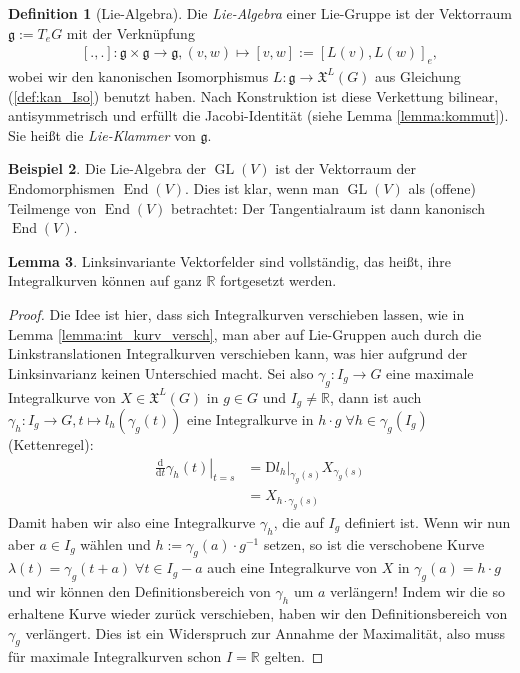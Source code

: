 \documentclass[a4paper]{scrbook}
\numberwithin{equation}{chapter}
\newcommand{\D}{\mathrm{d}}
\newcommand{\DD}{\mathrm{D}}
\DeclareMathOperator{\GL}{GL}
\DeclareMathOperator{\End}{End}
\newcommand{\R}{\mathbb{R}}
\newcommand{\vf}{\mathfrak{X}}
\theoremstyle{definition}
\newtheorem{defn}{Definition}[section]
\newtheorem{lemma}[defn]{Lemma}
\newtheorem{bsp}[defn]{Beispiel}
\begin{document}
		\begin{defn}[Lie-Algebra]
			Die \emph{Lie-Algebra} einer Lie-Gruppe ist der Vektorraum $\mathfrak{g}:=T_eG$ mit der Verknüpfung
			\begin{align*}
				\left[.,.\right]\colon \mathfrak{g}\times \mathfrak{g}\rightarrow \mathfrak{g}, (v,w)\mapsto \left[v,w\right]:=\left[L(v),L(w)\right]_e,
			\end{align*}
			wobei wir den kanonischen Isomorphismus $L\colon \mathfrak{g}\to \vf^L(G)$ aus Gleichung (\ref{def:kan_Iso}) benutzt haben. Nach Konstruktion ist diese Verkettung bilinear, antisymmetrisch und erfüllt die Jacobi-Identität (siehe Lemma \ref{lemma:kommut}). Sie heißt die \emph{Lie-Klammer} von $\mathfrak{g}$.
		\end{defn}
		\begin{bsp}\hfill
			Die Lie-Algebra der $\GL(V)$ ist der Vektorraum der Endomorphismen $\End(V)$. Dies ist klar, wenn man $\GL(V)$ als (offene) Teilmenge von $\End(V)$ betrachtet: Der Tangentialraum ist dann kanonisch $\End(V)$.
		\end{bsp}
		\begin{lemma}
			Linksinvariante Vektorfelder sind vollständig, das heißt, ihre Integralkurven können auf ganz $\R$ fortgesetzt werden.
			\begin{proof}
			Die Idee ist hier, dass sich Integralkurven verschieben lassen, wie in Lemma \ref{lemma:int_kurv_versch}, man aber auf Lie-Gruppen auch durch die Linkstranslationen Integralkurven verschieben kann, was hier aufgrund der Linksinvarianz keinen Unterschied macht. Sei also $\gamma_g\colon I_g\rightarrow G$ eine maximale Integralkurve von $X\in\vf^L(G)$ in $g\in G$ und $I_g\neq \R$, dann ist auch $\gamma_h\colon I_g\rightarrow G, t\mapsto l_h(\gamma_g(t))$ eine Integralkurve in $h\cdot g\;\forall h\in\gamma_g(I_g)$ (Kettenregel):
			\begin{align*}
				\left.\frac{\D}{\D t}\gamma_h(t)\right\vert_{t=s}&=\DD l_h\vert_{\gamma_g(s)} X_{\gamma_g(s)}\\
				&=X_{h\cdot \gamma_g(s)}
			\end{align*}
			Damit haben wir also eine Integralkurve $\gamma_h$, die auf $I_g$ definiert ist. Wenn wir nun aber $a \in I_g$ wählen und $h := \gamma_g(a) \cdot g^{-1}$ setzen, so ist die verschobene Kurve $\lambda(t)=\gamma_g(t+a)\;\forall t\in I_g-a$ auch eine Integralkurve von $X$ in $\gamma_g(a) = h \cdot g$ und wir können den Definitionsbereich von $\gamma_h$ um $a$ verlängern! Indem wir die so erhaltene Kurve wieder zurück verschieben, haben wir den Definitionsbereich von $\gamma_g$ verlängert. Dies ist ein Widerspruch zur Annahme der Maximalität, also muss für maximale Integralkurven schon $I=\R$ gelten.
			\end{proof}
		\end{lemma}
\end{document}

